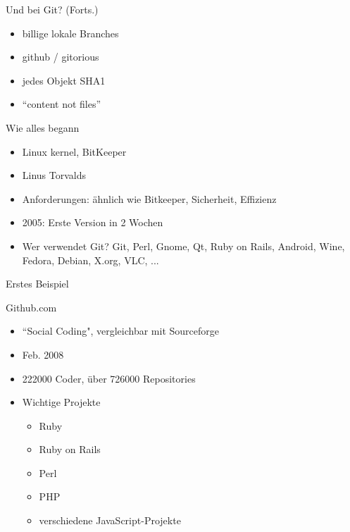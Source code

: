 \documentclass[12pt,a4paper]{beamer}
\begin{document}
\begin{frame}[<+->]{Und bei Git? (Forts.)}{}
  \begin{itemize}
    \item billige lokale Branches
    \item github / gitorious
    \item jedes Objekt SHA1
    \item ``content not files''
  \end{itemize}
\end{frame}

\begin{frame}[<+->]{Wie alles begann}{}
  \begin{itemize}
    \item Linux kernel, BitKeeper
    \item Linus Torvalds
    \item Anforderungen: ähnlich wie Bitkeeper, Sicherheit, Effizienz
    \item 2005: Erste Version in 2 Wochen
    \item Wer verwendet Git? Git, Perl, Gnome, Qt, Ruby on Rails, Android, Wine, Fedora, Debian, X.org, VLC, ...

  \end{itemize}
\end{frame}

\begin{frame}{Erstes Beispiel}

\end{frame}

\begin{frame}{Github.com}
\begin{itemize}
    \item ``Social Coding", vergleichbar mit Sourceforge
	\item Feb. 2008
	\item 222000 Coder, über 726000 Repositories
	\item Wichtige Projekte
	\begin{itemize}
	\item Ruby
	\item Ruby on Rails
	\item Perl
	\item PHP
	\item verschiedene JavaScript-Projekte
	\end{itemize}
  \end{itemize}
\end{frame}
\end{document}
